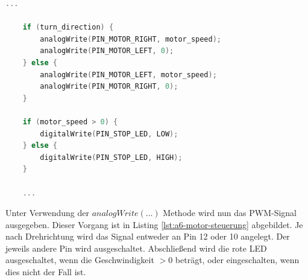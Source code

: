 \newpage

\begin{lstlisting}[language=C,label={lst:a6-motor-steuerung}, caption={Ansteuerung des Motors}]
    ...

    if (turn_direction) {
        analogWrite(PIN_MOTOR_RIGHT, motor_speed);
        analogWrite(PIN_MOTOR_LEFT, 0);
    } else {
        analogWrite(PIN_MOTOR_LEFT, motor_speed);
        analogWrite(PIN_MOTOR_RIGHT, 0);
    }

    if (motor_speed > 0) {
        digitalWrite(PIN_STOP_LED, LOW);
    } else {
        digitalWrite(PIN_STOP_LED, HIGH);
    }

    ...
\end{lstlisting}

Unter Verwendung der $analogWrite(\dots)$ Methode wird nun das PWM-Signal ausgegeben.
Dieser Vorgang ist in Listing \ref{lst:a6-motor-steuerung} abgebildet.
Je nach Drehrichtung wird das Signal entweder an Pin 12 oder 10 angelegt.
Der jeweils andere Pin wird ausgeschaltet.
Abschließend wird die rote LED ausgeschaltet, wenn die Geschwindigkeit $> 0$ beträgt, oder eingeschalten, wenn dies nicht der Fall ist.


